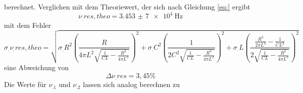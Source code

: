 berechnet.
Verglichen mit dem Theoriewert, der sich nach Gleichung \eqref{eq:} ergibt
\[
\nu_.{res,theo}=\SI{3,453(7)e4}{\hertz}
\]
mit dem Fehler
\[
\sigma_.{\nu_.{res},theo}=\sqrt{\sigma_.R^2\left(\frac{R}{4\pi L^2\sqrt{\frac{1}{CL}-\frac{R^2}{4\pi L^2}}}\right)^2+\sigma_.C^2\left(\frac{1}{2C^2\sqrt{\frac{1}{CL}-\frac{R^2}{4\pi L^2}}}\right)^2+\sigma_.L\left(\frac{\frac{R^2}{2\pi L^3}-\frac{1}{CL^2}}{2\sqrt{\frac{1}{CL}-\frac{R^2}{4\pi L^2}}}\right)^2}
\]
eine Abweichung von
\[
\Delta\nu_.{res}=3,45\%
\]
Die Werte für $\nu_.1$ und $\nu_.2$ lassen sich analog berechnen zu
